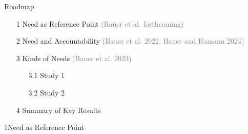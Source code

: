 \documentclass[xcolor=table,9pt,aspectratio=169]{beamer}
\begin{document}
\begin{frame}{\vspace*{10mm}Roadmap}
\begin{itemize}
   \item[1] \hspace*{1em}Need as Reference Point \textcolor{gray}{(Bauer et al. forthcoming)}
   \item[2] \hspace*{1em}Need and Accountability \textcolor{gray}{(Bauer et al. 2022, Bauer and Romann 2024)}
   \item[3] \hspace*{1em}Kinds of Needs \textcolor{gray}{(Bauer et al. 2023)}
   \begin{itemize}
      \item[3.1] \hspace*{1em}Study 1
      \item[3.2] \hspace*{1em}Study 2
   \end{itemize}
   \item[4] \hspace*{1em}Summary of Key Results
\end{itemize}
\end{frame}


\begin{frame}
\begin{overlayarea}{\textwidth}{0.81\paperheight}{
   \vspace*{11mm}
   \textcolor{uolblue}
   {1\hspace*{1em}Need as Reference Point}
}
\end{overlayarea}
\end{frame}
\end{document}
